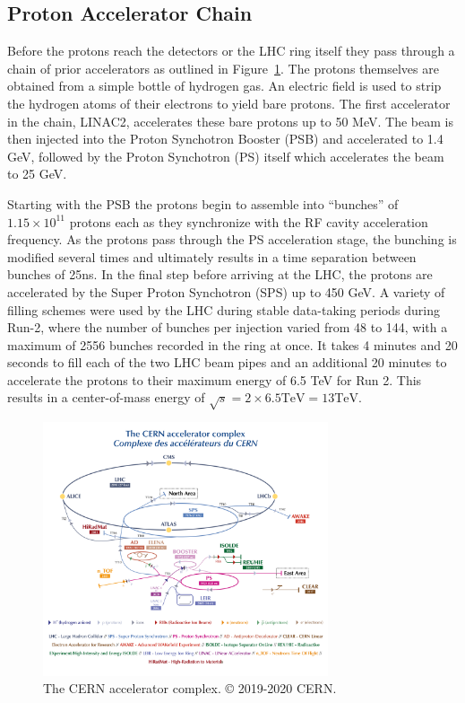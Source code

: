 
\subsection{Proton Accelerator Chain}
Before the protons reach the detectors or the LHC ring itself they pass through a chain of prior accelerators as outlined in Figure~\ref{fig:cern_accelerator_complex}.
The protons themselves are obtained from a simple bottle of hydrogen gas.
An electric field is used to strip the hydrogen atoms of their electrons to yield bare protons.
The first accelerator in the chain, LINAC2, accelerates these bare protons up to 50 MeV.
The beam is then injected into the Proton Synchotron Booster (PSB) and accelerated to 1.4 GeV, followed by the Proton Synchotron (PS) itself which accelerates the beam to 25 GeV.

Starting with the PSB the protons begin to assemble into ``bunches'' of $1.15 \times 10^{11}$ protons each as they synchronize with the RF cavity acceleration frequency. 
As the protons pass through the PS acceleration stage, the bunching is modified several times and ultimately results in a time separation between bunches of 25ns.
In the final step before arriving at the LHC, the protons are accelerated by the Super Proton Synchotron (SPS) up to 450 GeV.
A variety of filling schemes were used by the LHC during stable data-taking periods during Run-2, where the number of bunches per injection varied from 48 to 144, with a maximum of 2556 bunches recorded in the ring at once.
It takes 4 minutes and 20 seconds to fill each of the two LHC beam pipes and an additional 20 minutes to accelerate the protons to their maximum energy of 6.5 TeV for Run 2.
This results in a center-of-mass energy of $\sqrt{s} = 2 \times 6.5 \mathrm{TeV} = 13 \mathrm{TeV}$.

\begin{figure}
	\centering
	\includegraphics[width=0.75\textwidth]{cern_complex}
	\caption{The CERN accelerator complex. © 2019-2020 CERN.}
	\label{fig:cern_accelerator_complex}
\end{figure}

